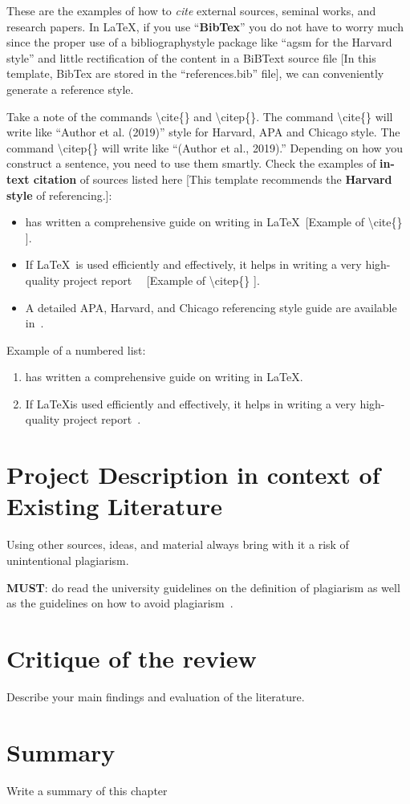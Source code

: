 These are the examples of how to \textit{cite} external sources, seminal works, and research papers. In \LaTeX, if you use ``\textbf{BibTex}'' you do not have to worry much since the proper use of a bibliographystyle package like ``agsm for the Harvard style'' and little rectification of the content in a BiBText source file [In this template, BibTex are stored in the ``references.bib'' file], we can conveniently generate  a reference style. 

Take a note of the commands \textbackslash cite\{\} and \textbackslash citep\{\}. The command \textbackslash cite\{\} will write like ``Author et al. (2019)'' style for Harvard, APA and Chicago style. The command \textbackslash citep\{\} will write like ``(Author et al., 2019).'' Depending on how you construct a sentence, you need to use them smartly. Check the examples of \textbf{in-text citation} of sources listed here [This template recommends the \textbf{Harvard style} of referencing.]:
\begin{itemize}
    \item \cite{lamport1994latex} has written a comprehensive guide on writing in \LaTeX ~[Example of \textbackslash cite\{\} ].
    \item If \LaTeX~is used efficiently and effectively, it helps in writing a very high-quality project report~\citep{lamport1994latex} ~[Example of \textbackslash citep\{\} ].   
    \item A detailed APA, Harvard, and Chicago referencing style guide are available in~\citep{uor_refernce_style}.
\end{itemize}

\noindent 
Example of a numbered list:
\begin{enumerate}
    \item \cite{lamport1994latex} has written a comprehensive guide on writing in \LaTeX.
    \item If \LaTeX is used efficiently and effectively, it helps in writing a very high-quality project report~\citep{lamport1994latex}.   
\end{enumerate}

\section{Project Description in context of Existing Literature}
Using other sources, ideas, and material always bring with it a risk of unintentional plagiarism. 

\noindent
\textbf{\color{red}MUST}: do read the university guidelines on the definition of plagiarism as well as the guidelines on how to avoid plagiarism~\citep{uor_plagiarism}.




\section{Critique of the review} %
Describe your main findings and evaluation of the literature. ~\\

\section{Summary} 
Write a summary of this chapter~\\
